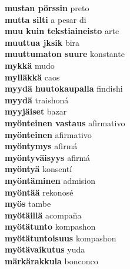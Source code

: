 \textbf{ mustan pörssin  } preto \\
\textbf{ mutta silti  } a pesar di \\
\textbf{ muu kuin tekstiaineisto  } arte \\
\textbf{ muuttua jksik  } bira \\
\textbf{ muuttumaton suure  } konstante \\
\textbf{ mykkä  } mudo \\
\textbf{ mylläkkä  } caos \\
\textbf{ myydä huutokaupalla  } findishi \\
\textbf{ myydä  } traishoná \\
\textbf{ myyjäiset  } bazar \\
\textbf{ myönteinen vastaus  } afirmativo \\
\textbf{ myönteinen  } afirmativo \\
\textbf{ myöntymys  } afirmá \\
\textbf{ myöntyväisyys  } afirmá \\
\textbf{ myöntyä  } konsentí \\
\textbf{ myöntäminen  } admision \\
\textbf{ myöntää  } rekonosé \\
\textbf{ myös  } tambe \\
\textbf{ myötäillä  } acompaña \\
\textbf{ myötätunto  } kompashon \\
\textbf{ myötätuntoisuus  } kompashon \\
\textbf{ myötävaikutus  } yuda \\
\textbf{ märkärakkula  } bonconco \\
